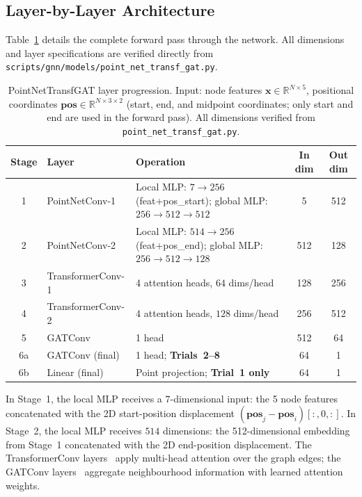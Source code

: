 \subsection{Layer-by-Layer Architecture}

Table~\ref{tab:architecture} details the complete forward pass through the network. All dimensions and layer specifications are verified directly from \texttt{scripts/gnn/models/\allowbreak{}point\_net\_transf\_gat.py}.

\begin{table}[htbp]
\centering
\caption[PointNetTransfGAT layer progression]{PointNetTransfGAT layer progression. Input: node features $\mathbf{x} \in \mathbb{R}^{N \times 5}$, positional coordinates $\mathbf{pos} \in \mathbb{R}^{N \times 3 \times 2}$ (start, end, and midpoint coordinates; only start and end are used in the forward pass). All dimensions verified from \texttt{point\_net\_transf\_gat.py}.}
\label{tab:architecture}
\begin{tabular}{clp{5.2cm}cc}
\toprule
\textbf{Stage} & \textbf{Layer} & \textbf{Operation} & \textbf{In dim} & \textbf{Out dim} \\
\midrule
1 & PointNetConv-1 & Local MLP: $7 \to 256$ (feat+pos\_start); global MLP: $256 \to 512 \to 512$ & 5 & 512 \\
2 & PointNetConv-2 & Local MLP: $514 \to 256$ (feat+pos\_end); global MLP: $256 \to 512 \to 128$ & 512 & 128 \\
3 & TransformerConv-1 & 4 attention heads, $64$ dims/head & 128 & 256 \\
4 & TransformerConv-2 & 4 attention heads, $128$ dims/head & 256 & 512 \\
5 & GATConv & 1 head & 512 & 64 \\
6a & GATConv (final) & 1 head; \textbf{Trials~2--8} & 64 & 1 \\
6b & Linear (final) & Point projection; \textbf{Trial~1 only} & 64 & 1 \\
\bottomrule
\end{tabular}
\end{table}

In Stage~1, the local MLP receives a $7$-dimensional input: the 5 node features concatenated with the 2D start-position displacement $(\mathbf{pos}_j - \mathbf{pos}_i)[:,0,:]$. In Stage~2, the local MLP receives $514$ dimensions: the 512-dimensional embedding from Stage~1 concatenated with the 2D end-position displacement. The TransformerConv layers~\cite{shi2021masked} apply multi-head attention over the graph edges; the GATConv layers~\cite{velickovic2018graph} aggregate neighbourhood information with learned attention weights.


